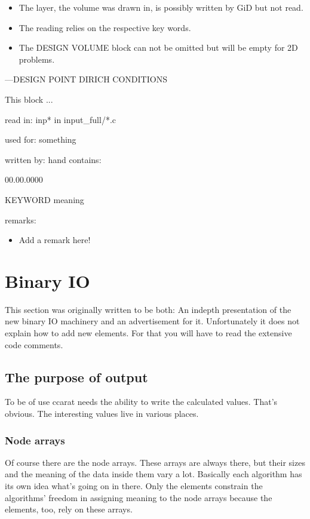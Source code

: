\begin{itemize}
\item The layer, the volume was drawn in, is possibly written by GiD but
not read. 
\item The reading relies on the respective key words. 
\item The DESIGN VOLUME block can not be omitted but will be empty for 2D
problems.
\end{itemize}
---DESIGN POINT DIRICH CONDITIONS 

This block ... 

read in: inp{*} in input\_full/{*}.c

used for: something 

written by: hand contains: 

\begin{lyxlist}{00.00.0000}
\item [{KEYWORD}] meaning 
\end{lyxlist}
remarks: 

\begin{itemize}
\item Add a remark here!
\end{itemize}


\section{Binary IO}

This section was originally written to be both: An indepth presentation
of the new binary IO machinery and an advertisement for it. Unfortunately
it does not explain how to add new elements. For that you will have
to read the extensive code comments.


\subsection{The purpose of output}

To be of use ccarat needs the ability to write the calculated values.
That's obvious. The interesting values live in various places.


\subsubsection{Node arrays}

Of course there are the node arrays. These arrays are always there,
but their sizes and the meaning of the data inside them vary a lot.
Basically each algorithm has its own idea what's going on in there.
Only the elements constrain the algorithms' freedom in assigning meaning
to the node arrays because the elements, too, rely on these arrays.

